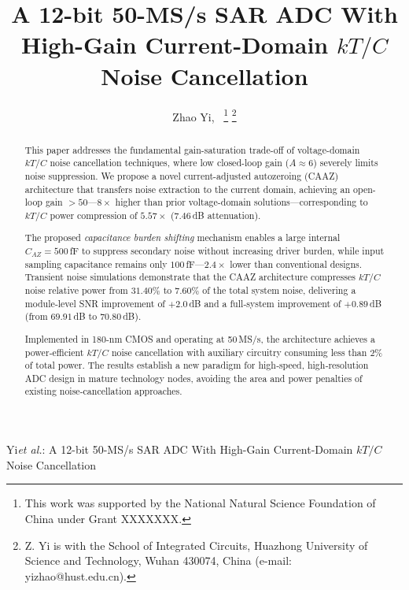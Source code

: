 \documentclass[journal]{IEEEtran}
\begin{document}
\title{A 12-bit 50-MS/s SAR ADC With High-Gain Current-Domain $kT/C$ Noise Cancellation}

\author{Zhao Yi,~
\thanks{This work was supported by the National Natural Science Foundation of China under Grant XXXXXXX.}
\thanks{Z. Yi is with the School of Integrated Circuits, Huazhong University of Science and Technology, Wuhan 430074, China (e-mail: yizhao@hust.edu.cn).}}

%
{Yi\MakeLowercase{\textit{et al.}}: A 12-bit 50-MS/s SAR ADC With High-Gain Current-Domain $kT/C$ Noise Cancellation}


\maketitle

\begin{abstract}
This paper addresses the fundamental gain-saturation trade-off of voltage-domain $kT/C$ noise cancellation techniques, where low closed-loop gain ($A\approx6$) severely limits noise suppression. We propose a novel current-adjusted autozeroing (CAAZ) architecture that transfers noise extraction to the current domain, achieving an open-loop gain $>50$—$8\times$ higher than prior voltage-domain solutions—corresponding to $kT/C$ power compression of $5.57\times$ ($7.46$\,dB attenuation). 

The proposed \textit{capacitance burden shifting} mechanism enables a large internal $C_{AZ}=500$\,fF to suppress secondary noise without increasing driver burden, while input sampling capacitance remains only $100$\,fF—$2.4\times$ lower than conventional designs. Transient noise simulations demonstrate that the CAAZ architecture compresses $kT/C$ noise relative power from $31.40\%$ to $7.60\%$ of the total system noise, delivering a module‑level SNR improvement of $+2.0$\,dB and a full‑system improvement of $+0.89$\,dB (from $69.91$\,dB to $70.80$\,dB). 

Implemented in 180‑nm CMOS and operating at 50\,MS/s, the architecture achieves a power‑efficient $kT/C$ noise cancellation with auxiliary circuitry consuming less than $2\%$ of total power. The results establish a new paradigm for high‑speed, high‑resolution ADC design in mature technology nodes, avoiding the area and power penalties of existing noise‑cancellation approaches.
\end{abstract}
\end{document}

